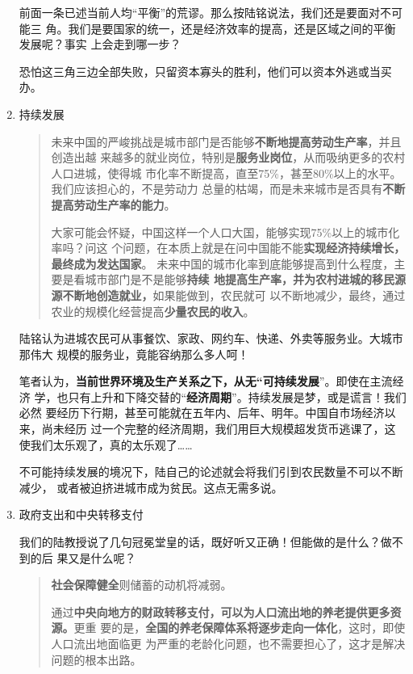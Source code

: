 \begin{enumerate}
  前面一条已述当前人均“平衡”的荒谬。那么按陆铭说法，我们还是要面对不可能三
  角。我们是要国家的统一，还是经济效率的提高，还是区域之间的平衡发展呢？事实
  上会走到哪一步？

  恐怕这三角三边全部失败，只留资本寡头的胜利，他们可以资本外逃或当买办。

\item 持续发展

  \begin{quotation}
    未来中国的严峻挑战是城市部门是否能够\textbf{不断地提高劳动生产率}，并且创造出越
    来越多的就业岗位，特别是\textbf{服务业岗位}，从而吸纳更多的农村人口进城，使得城
    市化率不断提高，直至75\%，甚至80\%以上的水平。我们应该担心的，不是劳动力
    总量的枯竭，而是未来城市是否具有\textbf{不断提高劳动生产率的能力}。

    大家可能会怀疑，中国这样一个人口大国，能够实现75\%以上的城市化率吗？问这
    个问题，在本质上就是在问中国能不能\textbf{实现经济持续增长，最终成为发达国家}。
    未来中国的城市化率到底能够提高到什么程度，主要是看城市部门是不是能够\textbf{持续
    地提高生产率，并为农村进城的移民源源不断地创造就业，}如果能做到，农民就可
    以不断地减少，最终，通过农业的规模化经营提高\textbf{少量农民的收入}。
  \end{quotation}

  陆铭认为进城农民可从事餐饮、家政、网约车、快递、外卖等服务业。大城市那伟大
  规模的服务业，竟能容纳那么多人呵！

  笔者认为，\textbf{当前世界环境及生产关系之下，从无“可持续发展}”。即使在主流经济
  学，也只有上升和下降交替的“\textbf{经济周期}”。持续发展是梦，或是谎言！我们必然
  要经历下行期，甚至可能就在五年内、后年、明年。中国自市场经济以来，尚未经历
  过一个完整的经济周期，我们用巨大规模超发货币逃课了，这使我们太乐观了，真的太乐观了……

  不可能持续发展的境况下，陆自己的论述就会将我们引到农民数量不可以不断减少，
  或者被迫挤进城市成为贫民。这点无需多说。

\item 政府支出和中央转移支付

  我们的陆教授说了几句冠冕堂皇的话，既好听又正确！但能做的是什么？做不到的后
  果又是什么呢？

  \begin{quotation}
    \textbf{社会保障健全}则储蓄的动机将减弱。

    通过\textbf{中央向地方的财政转移支付，可以为人口流出地的养老提供更多资源。}更重
    要的是，\textbf{全国的养老保障体系将逐步走向一体化}，这时，即使人口流出地面临更
    为严重的老龄化问题，也不需要担心了，这才是解决问题的根本出路。


\end{quotation}
\end{enumerate}

